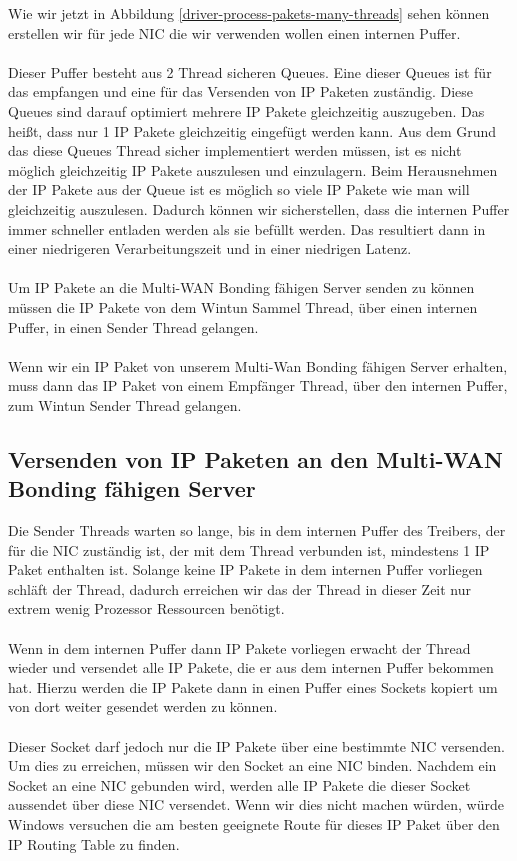 Wie wir jetzt in Abbildung \ref{driver-process-pakets-many-threads} sehen können erstellen wir für jede NIC die wir verwenden wollen einen internen Puffer.
\\\\
Dieser Puffer besteht aus 2 Thread sicheren Queues. Eine dieser Queues ist für das empfangen und eine für das Versenden von IP Paketen zuständig. Diese Queues sind darauf optimiert mehrere IP Pakete gleichzeitig auszugeben. Das heißt, dass nur 1 IP Pakete gleichzeitig eingefügt werden kann. Aus dem Grund das diese Queues Thread sicher implementiert werden müssen, ist es nicht möglich gleichzeitig IP Pakete auszulesen und einzulagern. Beim Herausnehmen der IP Pakete aus der Queue ist es möglich so viele IP Pakete wie man will gleichzeitig auszulesen. Dadurch können wir sicherstellen, dass die internen Puffer immer schneller entladen werden als sie befüllt werden. Das resultiert dann in einer niedrigeren Verarbeitungszeit und in einer niedrigen Latenz.
\\\\
Um IP Pakete an die Multi-WAN Bonding fähigen Server senden zu können müssen die IP Pakete von dem Wintun Sammel Thread, über einen internen Puffer, in einen Sender Thread gelangen. 
\\\\
Wenn wir ein IP Paket von unserem Multi-Wan Bonding fähigen Server erhalten, muss dann das IP Paket von einem Empfänger Thread, über den internen Puffer, zum Wintun Sender Thread gelangen.

\subsection{Versenden von IP Paketen an den Multi-WAN Bonding fähigen Server}
Die Sender Threads warten so lange, bis in dem internen Puffer des Treibers, der für die NIC zuständig ist, der mit dem Thread verbunden ist, mindestens 1 IP Paket enthalten ist. Solange keine IP Pakete in dem internen Puffer vorliegen schläft der Thread, dadurch erreichen wir das der Thread in dieser Zeit nur extrem wenig Prozessor Ressourcen benötigt.
\\\\
Wenn in dem internen Puffer dann IP Pakete vorliegen erwacht der Thread wieder und versendet alle IP Pakete, die er aus dem internen Puffer bekommen hat. Hierzu werden die IP Pakete dann in einen Puffer eines Sockets kopiert um von dort weiter gesendet werden zu können. 
\\\\
Dieser Socket darf jedoch nur die IP Pakete über eine bestimmte NIC versenden. Um dies zu erreichen, müssen wir den Socket an eine NIC binden. Nachdem ein Socket an eine NIC gebunden wird, werden alle IP Pakete die dieser Socket aussendet über diese NIC versendet. Wenn wir dies nicht machen würden, würde Windows versuchen die am besten geeignete Route für dieses IP Paket über den IP Routing Table zu finden.

